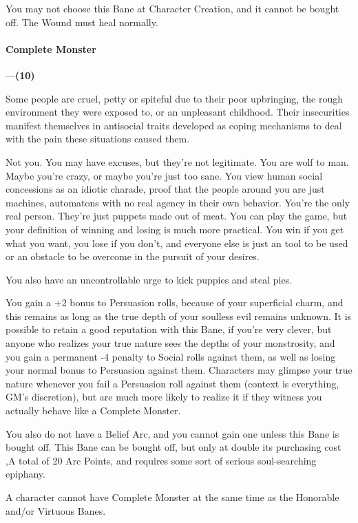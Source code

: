 \documentclass[oneside,11pt,english]{book}
\begin{document}
You may not choose this Bane at Character Creation, and it cannot be bought off. The Wound must heal normally. 
\paragraph{\label{bane:Complete Monster}Complete Monster}---\quad\textbf{(10) }\par
Some people are cruel, petty or spiteful due to their poor upbringing, the rough environment they were 
exposed to, or an unpleasant childhood. Their insecurities manifest themselves in antisocial traits 
developed as coping mechanisms to deal with the pain these situations caused them. 


Not you. You may have excuses, but they're not legitimate. You are wolf to man. Maybe you're crazy, or maybe you're just too sane. You view human social concessions as an idiotic charade, proof that the 
people around you are just machines, automatons with no real agency in their own behavior. You're the 
only real person. They're just puppets made out of meat. You can play the game, but your definition of 
winning and losing is much more practical. You win if you get what you want, you lose if you don't, and 
everyone else is just an tool to be used or an obstacle to be overcome in the pursuit of your desires. 


You also have an uncontrollable urge to kick puppies and steal pies. 


You gain a +2 bonus to Persuasion rolls, because of your superficial charm, and this remains as long as 
the true depth of your soulless evil remains unknown. It is possible to retain a good reputation with this 
Bane, if you're very clever, but anyone who realizes your true nature sees the depths of your monstrosity, 
and you gain a permanent -4 penalty to Social rolls against them, as well as losing your normal bonus to 
Persuasion against them. Characters may glimpse your true nature whenever you fail a Persuasion roll 
against them (context is everything, GM's discretion), but are much more likely to realize it if they 
witness you actually behave like a Complete Monster. 


You also do not have a Belief Arc, and you cannot gain one unless this Bane is bought off. This Bane can be bought off, but only at double its purchasing cost ,A total of 20 Arc Points, and requires some sort of serious soul-searching epiphany. 


A character cannot have Complete Monster at the same time as the Honorable and/or Virtuous Banes. 
\end{document}
